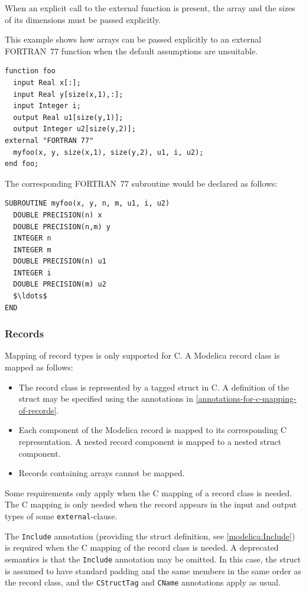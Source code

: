 When an explicit call to the external function is present, the array and the sizes of its dimensions must be passed explicitly.

\begin{example}
This example shows how arrays can be passed explicitly to an external FORTRAN~77 function when the default assumptions are unsuitable.

\begin{lstlisting}[language=modelica]
function foo
  input Real x[:];
  input Real y[size(x,1),:];
  input Integer i;
  output Real u1[size(y,1)];
  output Integer u2[size(y,2)];
external "FORTRAN 77"
  myfoo(x, y, size(x,1), size(y,2), u1, i, u2);
end foo;
\end{lstlisting}
The corresponding FORTRAN~77 subroutine would be declared as follows:
\begin{lstlisting}[language=FORTRAN77]
SUBROUTINE myfoo(x, y, n, m, u1, i, u2)
  DOUBLE PRECISION(n) x
  DOUBLE PRECISION(n,m) y
  INTEGER n
  INTEGER m
  DOUBLE PRECISION(n) u1
  INTEGER i
  DOUBLE PRECISION(m) u2
  $\ldots$
END
\end{lstlisting}
\end{example}

\subsubsection{Records}\label{records}

Mapping of record types is only supported for C.
A Modelica record class is mapped as follows:
\begin{itemize}
\item
  The record class is represented by a tagged struct in C.
  A definition of the struct may be specified using the annotations in \cref{annotations-for-c-mapping-of-records}.
\item
  Each component of the Modelica record is mapped to its corresponding C representation.
  A nested record component is mapped to a nested struct component.
\item
  Records containing arrays cannot be mapped.
\end{itemize}

Some requirements only apply when the C mapping of a record class is needed.
The C mapping is only needed when the record appears in the input and output types of some \lstinline!external!-clause.

The \lstinline!Include! annotation (providing the struct definition, see \cref{modelica:Include}) is required when the C mapping of the record class is needed.
A deprecated semantics is that the \lstinline!Include! annotation may be omitted.
In this case, the struct is assumed to have standard padding and the same members in the same order as the record class, and the \lstinline!CStructTag! and \lstinline!CName! annotations apply as usual.

